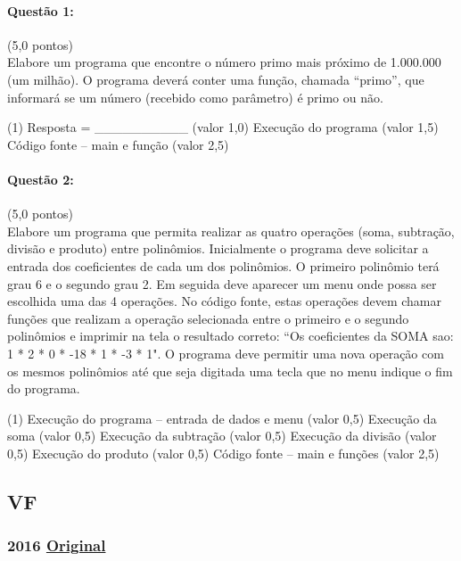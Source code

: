 \documentclass[12pt,a4paper]{article}
\newcommand{\original}[1]{\tiny \href{#1}{Original} \normalsize}
\begin{document}
\paragraph{Questão 1:}(5,0 pontos)\\
Elabore um programa que encontre o número primo mais próximo de 1.000.000 (um milhão). O programa deverá conter uma função, chamada “primo”, que informará se um número (recebido como parâmetro) é primo ou não. 
\begin{tasks}(1)
\task Resposta = \_\_\_\_\_\_\_\_\_\_ (valor 1,0) 
\task Execução do programa (valor 1,5)
\task Código fonte – main e função (valor 2,5)
\end{tasks}

\paragraph{Questão 2:}(5,0 pontos)\\
Elabore um programa que permita realizar as quatro operações (soma, subtração, divisão e produto) entre polinômios. 
Inicialmente o programa deve solicitar a entrada dos coeficientes de cada um dos polinômios. O primeiro polinômio terá grau 6 e o segundo grau 2. Em seguida deve aparecer um menu onde possa ser escolhida uma das 4 operações. No código fonte, estas operações devem chamar funções que realizam a operação selecionada entre o primeiro e o segundo polinômios e imprimir na tela o resultado correto: “Os coeficientes da SOMA sao: 1 * 2 * 0 * -18 * 1 * -3 * 1". O programa deve permitir uma nova operação com os mesmos polinômios até que seja digitada uma tecla que no menu indique o fim do programa.
\begin{tasks}(1)
\task Execução do programa – entrada de dados e menu (valor 0,5)
\task Execução da soma (valor 0,5)
\task Execução da subtração (valor 0,5)
\task Execução da divisão (valor 0,5)
\task Execução do produto (valor 0,5)
\task Código fonte – main e funções (valor 2,5)
\end{tasks}

\newpage
\subsection{VF}

\subsubsection{2016 \original{https://drive.google.com/file/d/10pS7YST8LVVbgfYnIcE-asuEZ8NFXkkc/view?usp=sharing}}
\end{document}
